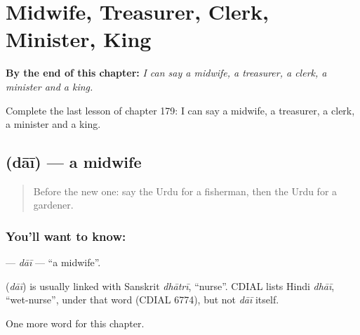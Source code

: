 
\chapter{Midwife, Treasurer, Clerk, Minister, King}
\label{ch:ur-midwife-treasurer-clerk-minister-king}

\begin{chapteropening}
\textbf{By the end of this chapter:} \emph{I can say a midwife, a treasurer, a clerk, a minister and a king.}

Complete the last lesson of chapter 179: I can say a midwife, a treasurer, a clerk, a minister and a king.
\end{chapteropening}

\section[\texorpdfstring{\ur{دائی} (dāī)}{دائی (dāī)}]{ (dāī) — a midwife}

\label{lesson:UR-C179-dai}



\begin{quote}
Before the new one: say the Urdu for a fisherman, then the Urdu for a gardener.
\end{quote}

\subsection*{You'll want to know: }
\textbf{} — \emph{dāī} — \textquotedblleft{}a midwife\textquotedblright{}.

\begin{cousinweb}
\textbf{} (\emph{dāī}) is usually linked with Sanskrit \emph{dhātrī}, \textquotedblleft{}nurse\textquotedblright{}. CDIAL lists Hindi \emph{dhāī}, \textquotedblleft{}wet-nurse\textquotedblright{}, under that word (CDIAL 6774), but not \emph{dāī} itself.
\end{cousinweb}

\begin{grammarlens}[title={What you've built}]
One more word for this chapter.
\end{grammarlens}

